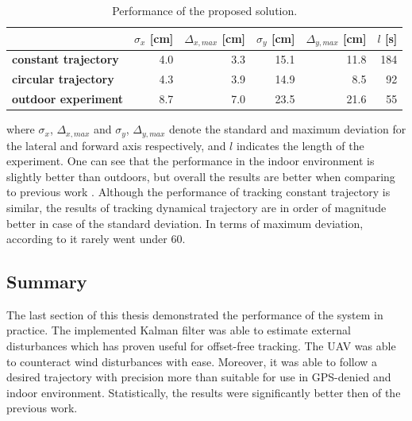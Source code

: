 \begin{table}[h]
\centering
\begin{tabular}{lrrrrr}
\hline
 & $\sigma_x$ [cm] & $\Delta_{x, max}$ [cm] & $\sigma_y$ [cm] & $\Delta_{y, max}$ [cm] & $l$ [s]\\
\hline
\textbf{constant trajectory} & 4.0 & 3.3 & 15.1 & 11.8 & 184 \\
\textbf{circular trajectory} & 4.3 & 3.9 & 14.9 & 8.5 & 92\\
\textbf{outdoor experiment} & 8.7 & 7.0 & 23.5 & 21.6 & 55\\
\hline
\end{tabular}
\caption{Performance of the proposed solution.}
\label{tab:compparison1}
\end{table}

where $\sigma_x$, $\Delta_{x, max}$ and $\sigma_y$, $\Delta_{y, max}$ denote the standard and maximum deviation for the lateral and forward axis respectively, and $l$ indicates the length of the experiment. One can see that the performance in the indoor environment is slightly better than outdoors, but overall the results are better when comparing to previous work \citep{endrych2014}. Although the performance of tracking constant trajectory is similar, the results of tracking dynamical trajectory are in order of magnitude better in case of the standard deviation. In terms of maximum deviation, according to \citep{endrych2014} it rarely went under 60.

\subsection{Summary}

The last section of this thesis demonstrated the performance of the system in practice. The implemented Kalman filter was able to estimate external disturbances which has proven useful for offset-free tracking. The UAV was able to counteract wind disturbances with ease. Moreover, it was able to follow a desired trajectory with precision more than suitable for use in GPS-denied and indoor environment. Statistically, the results were significantly better then of the previous work. 